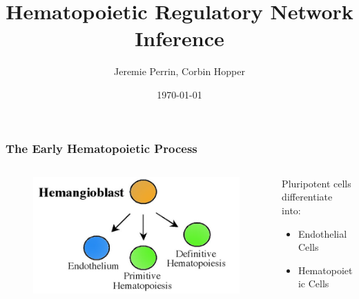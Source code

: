 \documentclass[14pt,aspectratio=169]{beamer}
\title{Hematopoietic Regulatory Network Inference}
\author{Jeremie Perrin, Corbin Hopper}
\institute{ENS Cachan}
\date{\today}
\begin{document}
\begin{frame}
\titlepage
\end{frame}
 
 \begin{frame}
 	\frametitle{The Early Hematopoietic  Process}
 	\begin{columns}[T] %
 		\begin{column}{.48\textwidth}
 			\begin{figure}
 				\includegraphics*[width=  \linewidth]{./images/hematopoieisis.jpg}
 			\end{figure}
 		\end{column}%
 		\hfill%
 		\begin{column}{.48\textwidth}
 			Pluripotent cells differentiate into:
 			\begin{itemize}
 				\item Endothelial Cells
 				\item Hematopoietic Cells
 			\end{itemize}
 		\end{column}%
 	\end{columns}
 \end{frame}
 
\end{document}
